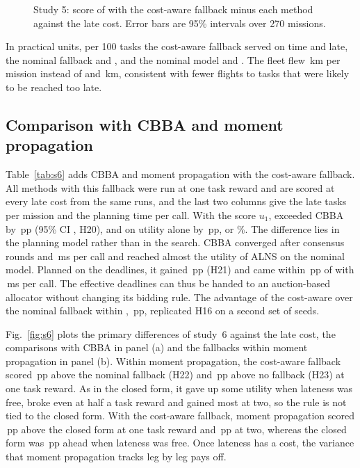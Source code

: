 \begin{figure}[t]
\centering
{}
\caption{Study 5: score of \mname{} with the cost-aware fallback minus each method against the late cost. Error bars
are 95\% intervals over 270 missions.}\label{fig:s5}
\end{figure}

In practical units, per 100 tasks the cost-aware fallback served  on time and 
late, the nominal fallback  and , and the nominal model  and
. The fleet flew \,km per mission instead of  and \,km,
consistent with fewer flights to tasks that were likely to be reached too late.

\subsection{Comparison with CBBA and moment propagation}\label{sec:study6}
Table~\ref{tab:s6} adds CBBA and moment propagation with the cost-aware fallback. All methods with this fallback were
run at one task reward and are scored at every late cost from the same runs, and the last two columns give the late
tasks per mission and the planning time per call. With the score $u_1$, \mname{} exceeded CBBA by
\,pp (95\% CI , H20), and on utility alone by \,pp, or
\%. The difference lies in the planning model rather than in the search. CBBA converged after
 consensus rounds and \,ms per call and reached almost the utility of ALNS on the nominal
model. Planned on the \mname{} deadlines, it gained \,pp (H21) and came within
\,pp of \mname{} with \,ms per call. The effective deadlines can thus be handed
to an auction-based allocator without changing its bidding rule. The advantage of the cost-aware over the nominal
fallback within \mname{}, \,pp, replicated H16 on a second set of seeds.


Fig.~\ref{fig:s6} plots the primary differences of study~6 against the late cost, the comparisons with CBBA in panel
(a) and the fallbacks within moment propagation in panel (b). Within moment propagation, the
cost-aware fallback scored \,pp above the nominal fallback (H22) and \,pp above
no fallback (H23) at one task reward. As in the closed form, it gave up some utility when lateness was free, broke even
at half a task reward and gained most at two, so the rule is not tied to the closed form. With the cost-aware fallback,
moment propagation scored \,pp above the closed form at one task reward and
\,pp at two, whereas the closed form was \,pp ahead when lateness was free.
Once lateness has a cost, the variance that moment propagation tracks leg by leg pays off.

